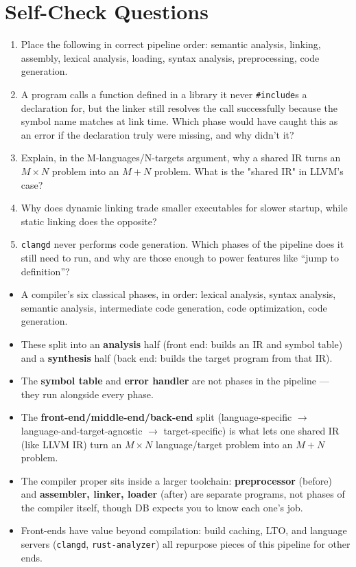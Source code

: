 \documentclass[11pt]{article}
\begin{document}
\section{Self-Check Questions}

\begin{enrichment}
\begin{enumerate}
  \item Place the following in correct pipeline order: semantic analysis, linking, assembly,
  lexical analysis, loading, syntax analysis, preprocessing, code generation.
  \item A program calls a function defined in a library it never \texttt{\#include}s a
  declaration for, but the linker still resolves the call successfully because the symbol name
  matches at link time. Which phase would have caught this as an error if the declaration truly
  were missing, and why didn't it?
  \item Explain, in the M-languages/N-targets argument, why a shared IR turns an
  $M \times N$ problem into an $M + N$ problem. What is the "shared IR" in LLVM's case?
  \item Why does dynamic linking trade smaller executables for slower startup, while static
  linking does the opposite?
  \item \texttt{clangd} never performs code generation. Which phases of the pipeline does it
  still need to run, and why are those enough to power features like ``jump to definition''?
\end{enumerate}
\end{enrichment}

\begin{takeaways}
\begin{itemize}
  \item A compiler's six classical phases, in order: lexical analysis, syntax analysis, semantic
  analysis, intermediate code generation, code optimization, code generation.
  \item These split into an \textbf{analysis} half (front end: builds an IR and symbol table)
  and a \textbf{synthesis} half (back end: builds the target program from that IR).
  \item The \textbf{symbol table} and \textbf{error handler} are not phases in the pipeline ---
  they run alongside every phase.
  \item The \textbf{front-end/middle-end/back-end} split (language-specific $\to$
  language-and-target-agnostic $\to$ target-specific) is what lets one shared IR (like LLVM IR)
  turn an $M \times N$ language/target problem into an $M + N$ problem.
  \item The compiler proper sits inside a larger toolchain: \textbf{preprocessor} (before) and
  \textbf{assembler, linker, loader} (after) are separate programs, not phases of the compiler
  itself, though DB expects you to know each one's job.
  \item Front-ends have value beyond compilation: build caching, LTO, and language servers
  (\texttt{clangd}, \texttt{rust-analyzer}) all repurpose pieces of this pipeline for other ends.
\end{itemize}
\end{takeaways}
\end{document}
